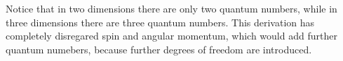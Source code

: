 Notice that in two dimensions there are only two quantum numbers, while in three 
dimensions there are three quantum numbers. This derivation has completely disregared 
spin and angular momentum, which would add further quantum numebers, because further
degrees of freedom are introduced.

\clearemptydoublepage
